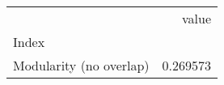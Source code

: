 \begin{tabular}{lr}
\toprule
{} &     value \\
Index                   &           \\
\midrule
Modularity (no overlap) &  0.269573 \\
\bottomrule
\end{tabular}
